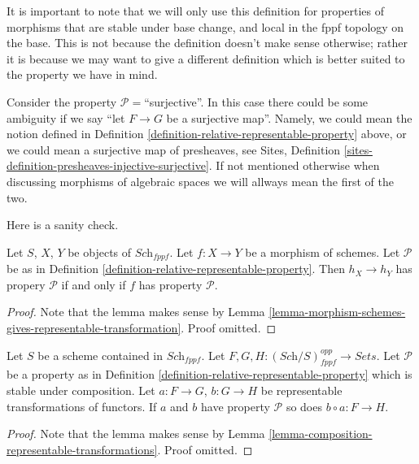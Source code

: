 \noindent
It is important to note that we will only use this definition for
properties of morphisms that are stable under base change, and
local in the fppf topology on the base. This is
not because the definition doesn't make sense otherwise; rather it
is because we may want to give a different definition which is
better suited to the property we have in mind.

\begin{remark}
\label{remark-warning}
Consider the property $\mathcal{P}=$``surjective''.
In this case there could be some ambiguity if we say
``let $F \to G$ be a surjective map''.
Namely, we could mean the notion defined
in Definition \ref{definition-relative-representable-property}
above, or we could mean a surjective map of presheaves, see
Sites, Definition \ref{sites-definition-presheaves-injective-surjective}.
If not mentioned otherwise when
discussing morphisms of algebraic spaces we will allways mean
the first of the two.
\end{remark}


\noindent
Here is a sanity check.

\begin{lemma}
\label{lemma-morphism-schemes-gives-representable-transformation-property}
Let $S$, $X$, $Y$ be objects of $\textit{Sch}_{fppf}$.
Let $f : X \to Y$ be a morphism of schemes.
Let $\mathcal{P}$ be as in
Definition \ref{definition-relative-representable-property}.
Then $h_X \longrightarrow h_Y$ has propery $\mathcal{P}$ if
and only if $f$ has property $\mathcal{P}$.
\end{lemma}

\begin{proof}
Note that the lemma makes sense by
Lemma \ref{lemma-morphism-schemes-gives-representable-transformation}.
Proof omitted.
\end{proof}

\begin{lemma}
\label{lemma-composition-representable-transformations-property}
Let $S$ be a scheme contained in $\textit{Sch}_{fppf}$.
Let $F, G, H : (\textit{Sch}/S)_{fppf}^{opp} \to \textit{Sets}$.
Let $\mathcal{P}$ be a property as in
Definition \ref{definition-relative-representable-property}
which is stable under composition.
Let $a : F \to G$, $b : G \to H$ be representable transformations of functors.
If $a$ and $b$ have property $\mathcal{P}$ so does
$b \circ a : F \longrightarrow H$.
\end{lemma}

\begin{proof}
Note that the lemma makes sense by
Lemma \ref{lemma-composition-representable-transformations}.
Proof omitted.
\end{proof}

